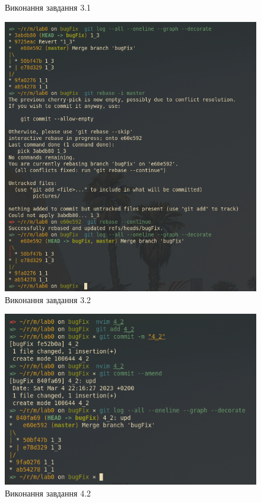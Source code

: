 \documentclass[oneside,14pt]{extarticle}
\begin{document}
\begin{normalsize}
\begin{figure}[H]
			\caption{Виконання завдання 3.1}
		\end{figure}
				\begin{figure}[H]
			\centering
			\includegraphics[scale=0.6]{3_2}
			\caption{Виконання завдання 3.2}
		\end{figure}
		\begin{figure}[H]
			\centering
			\includegraphics[scale=0.6]{4_2}
			\caption{Виконання завдання 4.2}
		\end{figure}

\end{normalsize}
\end{document}
